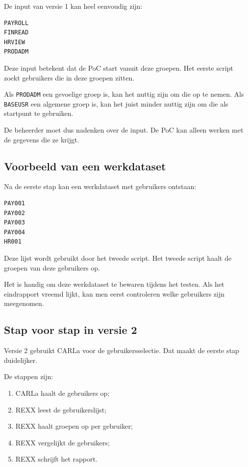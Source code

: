De input van versie 1 kan heel eenvoudig zijn:

\begin{verbatim}
PAYROLL
FINREAD
HRVIEW
PRODADM
\end{verbatim}

Deze input betekent dat de PoC start vanuit deze groepen. Het eerste script zoekt gebruikers die in deze groepen zitten.

Als \texttt{PRODADM} een gevoelige groep is, kan het nuttig zijn om die op te nemen. Als \texttt{BASEUSR} een algemene groep is, kan het juist minder nuttig zijn om die als startpunt te gebruiken.

De beheerder moet dus nadenken over de input. De PoC kan alleen werken met de gegevens die ze krijgt.

\subsection*{Voorbeeld van een werkdataset}

Na de eerste stap kan een werkdataset met gebruikers ontstaan:

\begin{verbatim}
PAY001
PAY002
PAY003
PAY004
HR001
\end{verbatim}

Deze lijst wordt gebruikt door het tweede script. Het tweede script haalt de groepen van deze gebruikers op.

Het is handig om deze werkdataset te bewaren tijdens het testen. Als het eindrapport vreemd lijkt, kan men eerst controleren welke gebruikers zijn meegenomen.

\subsection*{Stap voor stap in versie 2}

Versie 2 gebruikt CARLa voor de gebruikersselectie. Dat maakt de eerste stap duidelijker.

De stappen zijn:

\begin{enumerate}
	\item CARLa haalt de gebruikers op;
	\item REXX leest de gebruikerslijst;
	\item REXX haalt groepen op per gebruiker;
	\item REXX vergelijkt de gebruikers;
	\item REXX schrijft het rapport.
\end{enumerate}

